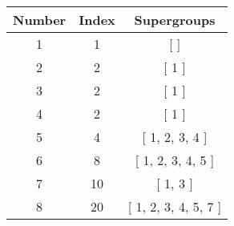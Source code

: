 \begin{center}
\begin{tabular}[H]{|| c c c ||}
\hline
Number &  Index &  Supergroups
\\\hline
1 & 1 & [  ]
\\\hline
2 & 2 & [ 1 ]
\\\hline
3 & 2 & [ 1 ]
\\\hline
4 & 2 & [ 1 ]
\\\hline
5 & 4 & [ 1, 2, 3, 4 ]
\\\hline
6 & 8 & [ 1, 2, 3, 4, 5 ]
\\\hline
7 & 10 & [ 1, 3 ]
\\\hline
8 & 20 & [ 1, 2, 3, 4, 5, 7 ]
\\\hline
\end{tabular}
\end{center}
